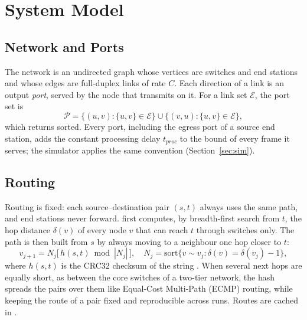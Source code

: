 \documentclass[9pt,a4paper,twocolumn,twoside]{tau-class/tau}
\providecommand{\secref}[1]{Section~\ref{#1}}
\begin{document}

\section{System Model}

    \subsection{Network and Ports}

        The network is an undirected graph whose vertices are switches and end stations and whose edges are full-duplex links of rate $C$. Each direction of a link is an output \emph{port}, served by the node that transmits on it. For a link set $\mathcal{E}$, the port set is
        \begin{equation}\label{eq:ports}
            \mathcal{P} = \{(u,v) : \{u,v\} \in \mathcal{E}\} \cup \{(v,u) : \{u,v\} \in \mathcal{E}\},
        \end{equation}
        which  returns sorted. Every port, including the egress port of a source end station, adds the constant processing delay $t_{proc}$ to the bound of every frame it serves; the simulator applies the same convention (\secref{sec:sim}).

    \subsection{Routing}

        Routing is fixed: each source--destination pair $(s,t)$ always uses the same path, and end stations never forward.  first computes, by breadth-first search from $t$, the hop distance $\delta(v)$ of every node $v$ that can reach $t$ through switches only. The path is then built from $s$ by always moving to a neighbour one hop closer to $t$:
        \begin{equation}\label{eq:route}
            v_{j+1} = N_j\big[\, h(s,t) \bmod |N_j| \,\big], \quad
            N_j = \mathrm{sort}\{v \sim v_j : \delta(v) = \delta(v_j) - 1\},
        \end{equation}
        where $h(s,t)$ is the CRC32 checksum of the string . When several next hops are equally short, as between the core switches of a two-tier network, the hash spreads the pairs over them like Equal-Cost Multi-Path (ECMP) routing, while keeping the route of a pair fixed and reproducible across runs. Routes are cached in .
\end{document}
